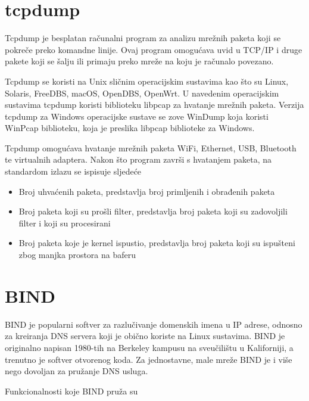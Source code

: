 \documentclass[12pt, oneside, onecolumn]{book}
\begin{document}
{\section{tcpdump}
Tcpdump je besplatan računalni program za analizu mrežnih paketa koji se pokreče preko komandne linije. Ovaj program omogućava uvid u TCP/IP i druge pakete koji se šalju ili primaju preko mreže na koju je računalo povezano.

Tcpdump se koristi na Unix sličnim operacijskim sustavima kao što su Linux, Solaris, FreeDBS, macOS, OpenDBS, OpenWrt. U navedenim operacijskim sustavima tcpdump koristi biblioteku libpcap za hvatanje mrežnih paketa. Verzija tcpdump za Windows operacijske sustave se zove WinDump koja koristi WinPcap biblioteku, koja je preslika libpcap biblioteke za Windows.

Tcpdump omogućava hvatanje mrežnih paketa WiFi, Ethernet, USB, Bluetooth te virtualnih adaptera. Nakon što program završi s hvatanjem paketa, na standardom izlazu se ispisuje sljedeće \cite{tpdump}

\begin{itemize}
\item Broj uhvaćenih paketa, predstavlja broj primljenih i obrađenih paketa
\item Broj paketa koji su prošli filter, predstavlja broj paketa koji su zadovoljili filter i koji su procesirani
\item Broj paketa koje je kernel ispustio, predstavlja broj paketa koji su ispušteni zbog manjka prostora na baferu
\end{itemize}

\section{BIND}
BIND je popularni softver za razlučivanje domenskih imena u IP adrese, odnosno za kreiranja DNS servera koji je obično koriste na Linux sustavima. BIND je originalno napisan 1980-tih na Berkeley kampusu na sveučilištu u Kaliforniji, a trenutno je softver otvorenog koda. Za jednostavne, male mreže BIND je i više nego dovoljan za pružanje DNS usluga.

Funkcionalnosti koje BIND pruža su \cite{bind}

}
\end{document}
